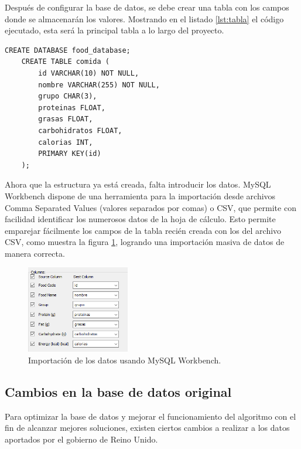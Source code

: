 \newpage

Después de configurar la base de datos, se debe crear una tabla con los campos donde se almacenarán los valores. Mostrando en el listado \ref{lst:tabla} el código ejecutado, esta será la principal tabla a lo largo del proyecto.

\begin{lstlisting}[style=sqlstyle, caption=Creación de la tabla y sus campos., label={lst:tabla}]
    CREATE DATABASE food_database;
    CREATE TABLE comida (
        id VARCHAR(10) NOT NULL,
        nombre VARCHAR(255) NOT NULL,
        grupo CHAR(3),
        proteinas FLOAT,
        grasas FLOAT,
        carbohidratos FLOAT,
        calorias INT,
        PRIMARY KEY(id)
    );
\end{lstlisting}

Ahora que la estructura ya está creada, falta introducir los datos. MySQL Workbench dispone de una herramienta para la importación desde archivos Comma Separated Values (valores separados por comas) o CSV, que permite con facilidad identificar los numerosos datos de la hoja de cálculo. Esto permite emparejar fácilmente los campos de la tabla recién creada con los del archivo CSV, como muestra la figura \ref{fig:importacion}, logrando una importación masiva de datos de manera correcta.

\begin{figure}[H]
    \centering
    \includegraphics[width=0.4\textwidth]{figures/importacion.png}
    \caption{Importación de los datos usando MySQL Workbench.}
    \label{fig:importacion}
\end{figure}

\subsection{Cambios en la base de datos original}

Para optimizar la base de datos y mejorar el funcionamiento del algoritmo con el fin de alcanzar mejores soluciones, existen ciertos cambios a realizar a los datos aportados por el gobierno de Reino Unido.

